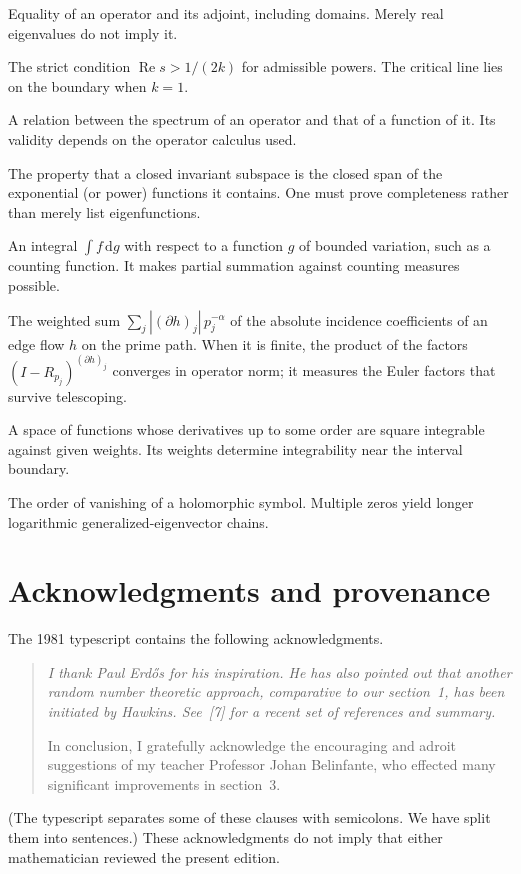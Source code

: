 \documentclass[12pt,letterpaper]{article}
\theoremstyle{definition}
\theoremstyle{remark}
\numberwithin{equation}{section}
\newcommand{\Ree}{\operatorname{Re}}
\newcommand{\dd}{\,\mathrm{d}}
\begin{document}
\begin{description}[style=nextline,leftmargin=1.5em]
\item[Self-adjointness] Equality of an operator and its adjoint, including domains. Merely real eigenvalues do not imply it.
\item[Sobolev threshold] The strict condition $\Ree s>1/(2k)$ for admissible powers. The critical line lies on the boundary when $k=1$.
\item[Spectral mapping] A relation between the spectrum of an operator and that of a function of it. Its validity depends on the operator calculus used.
\item[Spectral synthesis] The property that a closed invariant subspace
  is the closed span of the exponential (or power) functions it contains. One must prove completeness rather than merely list eigenfunctions.
\item[Stieltjes integral] An integral $\int f\dd g$ with respect to a
  function $g$ of bounded variation, such as a counting function. It makes partial summation against counting measures possible.
\item[Weighted boundary variation] The weighted sum $\sum_j|(\partial h)_j|\,p_j^{-\alpha}$ of the absolute incidence coefficients of an edge flow $h$ on the prime path. When it is finite, the product of the factors $(I-R_{p_j})^{(\partial h)_j}$ converges in operator norm; it measures the Euler factors that survive telescoping.
\item[Weighted Sobolev space] A space of functions whose derivatives up
  to some order are square integrable against given weights. Its weights determine integrability near the interval boundary.

\item[Zero multiplicity] The order of vanishing of a holomorphic symbol. Multiple zeros yield longer logarithmic generalized-eigenvector chains.
\end{description}

\section*{Acknowledgments and provenance}

The 1981 typescript contains the following acknowledgments.
\begin{quote}\itshape
I thank Paul Erd\H{o}s for his inspiration. He has also pointed out that
another random number theoretic approach, comparative to our section~1,
has been initiated by Hawkins. See~[7] for a recent set of references and
summary.

In conclusion, I gratefully acknowledge the encouraging and adroit
suggestions of my teacher Professor Johan Belinfante, who effected many
significant improvements in section~3.
\end{quote}
(The typescript separates some of these clauses with semicolons. We have
split them into sentences.) These acknowledgments do not imply that either
mathematician reviewed the present edition.
\end{document}
